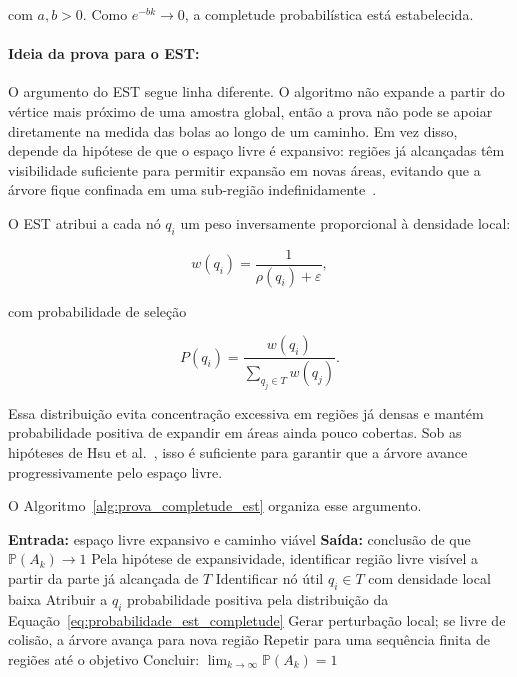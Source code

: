 com $a, b > 0$. Como $e^{-bk} \rightarrow 0$, a completude probabilística está estabelecida.

\paragraph{Ideia da prova para o EST:}

O argumento do EST segue linha diferente. O algoritmo não expande a partir do vértice mais próximo de uma amostra global, então a prova não pode se apoiar diretamente na medida das bolas ao longo de um caminho. Em vez disso, depende da hipótese de que o espaço livre é expansivo: regiões já alcançadas têm visibilidade suficiente para permitir expansão em novas áreas, evitando que a árvore fique confinada em uma sub-região indefinidamente~\cite{hsu1997path,hsu1999path}.

O EST atribui a cada nó $q_i$ um peso inversamente proporcional à densidade local:

\begin{equation}
    w(q_i) = \frac{1}{\rho(q_i) + \varepsilon},
    \label{eq:peso_est_completude}
\end{equation}

com probabilidade de seleção

\begin{equation}
    P(q_i) = \frac{w(q_i)}{\sum_{q_j \in T} w(q_j)}.
    \label{eq:probabilidade_est_completude}
\end{equation}

Essa distribuição evita concentração excessiva em regiões já densas e mantém probabilidade positiva de expandir em áreas ainda pouco cobertas. Sob as hipóteses de Hsu et al.~\cite{hsu1997path,hsu1999path}, isso é suficiente para garantir que a árvore avance progressivamente pelo espaço livre.

O Algoritmo~\ref{alg:prova_completude_est} organiza esse argumento.

\begin{algorithm}[H]
\caption{Esquema de prova da completude probabilística do EST}
\label{alg:prova_completude_est}
\begin{algorithmic}[1]
\State \textbf{Entrada:} espaço livre expansivo e caminho viável
\State \textbf{Saída:} conclusão de que $\mathbb{P}(A_k) \rightarrow 1$
\State Pela hipótese de expansividade, identificar região livre visível a partir da parte já alcançada de $T$
\State Identificar nó útil $q_i \in T$ com densidade local baixa
\State Atribuir a $q_i$ probabilidade positiva pela distribuição da Equação~\ref{eq:probabilidade_est_completude}
\State Gerar perturbação local; se livre de colisão, a árvore avança para nova região
\State Repetir para uma sequência finita de regiões até o objetivo
\State Concluir: $\lim_{k \to \infty}\mathbb{P}(A_k)=1$
\end{algorithmic}
\end{algorithm}

